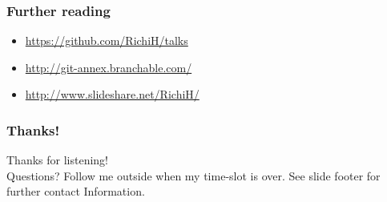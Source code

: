 \documentclass[t]{beamer}
\begin{document}
\begin{frame}
	\frametitle{Further reading}
	\begin{itemize}
		\item \url{https://github.com/RichiH/talks}
		\item \url{http://git-annex.branchable.com/}
		\item \url{http://www.slideshare.net/RichiH/}
		\end{itemize}
\end{frame}

\begin{frame}
	\frametitle{Thanks!}
		\begin{center}
			\vfill
			Thanks for listening!\\
			\vfill
			Questions? Follow me outside when my time-slot is over.
			\vfill
			See slide footer for further contact Information.
			\vfill
		\end{center}
\end{frame}
\end{document}
